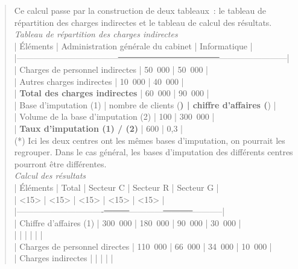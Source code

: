\documentclass{tufte-handout}
\begin{document}
\begin{enumerate}
\begin{enumerate}
\begin{verse}
Ce calcul passe par la construction de deux tableaux : le tableau de répartition des charges indirectes et le tableau de calcul des résultats.\\
\emph{Tableau de répartition des charges indirectes}\\
| Éléments                           | Administration générale du cabinet | Informatique           |\\
|------------------------------------\sout{------------------------------------}------------------------|\\
| Charges de personnel indirectes    | 50 000                             | 50 000                 |\\
| Autres charges indirectes          | 10 000                             | 40 000                 |\\
| \textbf{Total des charges indirectes}     | 60 000                             | 90 000                 |\\
| Base d'imputation (1)              | nombre de clients (\textbf{)              | chiffre d'affaires (}) |\\
| Volume de la base d'imputation (2) | 100                                | 300 000                |\\
| \textbf{Taux d'imputation (1) / (2)}      | 600                                | 0,3                    |\\
(*) Ici les deux centres ont les mêmes bases d'imputation, on pourrait les regrouper. Dans le cas général, les bases d'imputation des différents centres pourront être différentes.\\
\vspace*{1em}
\emph{Calcul des résultats}\\
\vspace*{1em}
| Éléments                      | Total   | Secteur C  | Secteur R | Secteur G |\\
| <15>                          | <15>    | <15>       | <15>      | <15>      |\\
|-------------------------------\sout{---------}------------\sout{-----------}-----------|\\
| Chiffre d'affaires (1)        | 300 000 | 180 000    | 90 000    | 30 000    |\\
|                               |         |            |           |           |\\
| Charges de personnel directes | 110 000 | 66 000     | 34 000    | 10 000    |\\
| Charges indirectes            |         |            |           |           |\\

\end{verse}
\end{enumerate}
\end{enumerate}
\end{document}

